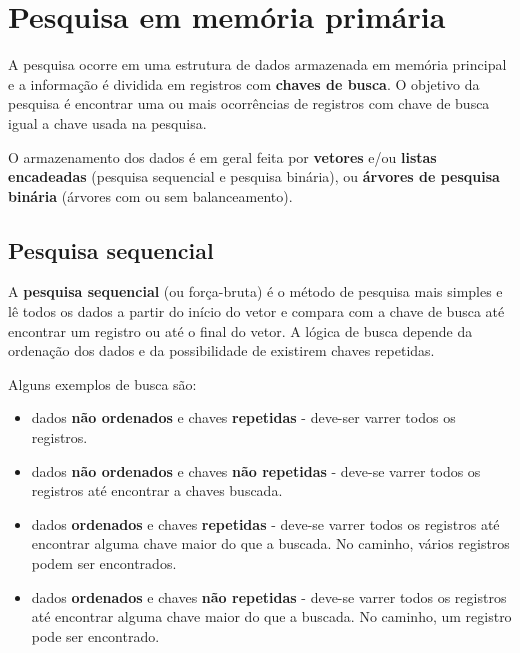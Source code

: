 \chapter{Pesquisa em memória primária}

A pesquisa ocorre em uma estrutura de dados armazenada em memória principal e
a informação é dividida em registros com {\bf chaves de busca}.
O objetivo da pesquisa é encontrar uma ou mais ocorrências de registros com
chave de busca igual a chave usada na pesquisa.

O armazenamento dos dados é em geral feita por {\bf vetores} e/ou {\bf listas
encadeadas} (pesquisa sequencial e pesquisa binária), ou {\bf árvores de
pesquisa binária} (árvores com ou sem balanceamento).

\section{Pesquisa sequencial}

A {\bf pesquisa sequencial} (ou força-bruta) é o método de pesquisa mais
simples e lê todos os dados a partir do início do vetor e compara com a chave
de busca até encontrar um registro ou até o final do vetor.
A lógica de busca depende da ordenação dos dados e da possibilidade de existirem
chaves repetidas.

Alguns exemplos de busca são:
\begin{itemize}
\item dados {\bf não ordenados} e chaves {\bf repetidas} - deve-ser
varrer todos os registros.

\item dados {\bf não ordenados} e chaves {\bf não repetidas} - 
deve-se varrer todos os registros até encontrar a chaves buscada.

\item dados {\bf ordenados} e chaves {\bf repetidas} -
deve-se varrer todos os registros até encontrar alguma chave maior 
do que a buscada.
No caminho, vários registros podem ser encontrados.

\item dados {\bf ordenados} e chaves {\bf não repetidas} -
deve-se varrer todos os registros até encontrar alguma chave maior 
do que a buscada.
No caminho, um registro pode ser encontrado.

\end{itemize}

